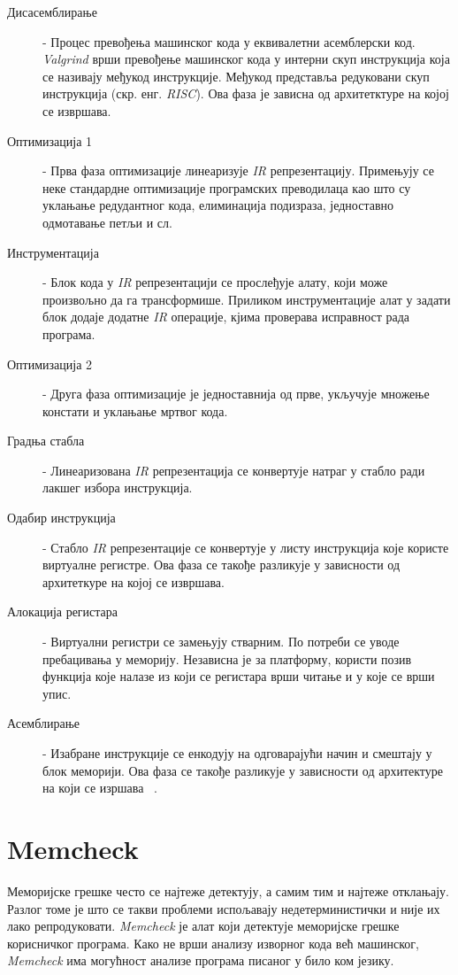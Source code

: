 \documentclass[12pt,oneside]{memoir}
\begin{document}
\begin{description}
	\item[Дисасемблирање] - Процес превођења машинског кода у еквивалетни асемблерски код. \textit{Valgrind} врши превођење машинског кода у интерни скуп инструкција која се називају међукод инструкције. Међукод представља редуковани скуп инструкција (скр. енг. \textit{RISC}). Ова фаза је зависна од архитетктуре на којој се извршава.
	\item[Оптимизација 1] - Прва фаза оптимизације линеаризује \textit{IR} репрезентацију. Примењују се неке стандардне оптимизације програмских преводилаца као што су уклањање редудантног кода, елиминација подизраза, једноставно одмотавање петљи и сл.
	\item[Инструментација] - Блок кода у \textit{IR} репрезентацији се прослеђује алату, који може произвољно да га трансформише. Приликом инструментације алат у задати блок додаје додатне \textit{IR} операције, кјима проверава исправност рада програма.
	\item[Оптимизација 2] - Друга фаза оптимизације је једноставнија од прве, укључује множење констати и уклањање мртвог кода.
	\item[Градња стабла] - Линеаризована \textit{IR} репрезентација се конвертује натраг у стабло ради лакшег избора инструкција.
	\item[Одабир инструкција] - Стабло \textit{IR} репрезентације се конвертује у листу инструкција које користе виртуалне регистре. Ова фаза се такође разликује у зависности од архитеткуре на којој се извршава.
	\item[Алокација регистара] - Виртуални регистри се замењују стварним. По потреби се уводе пребацивања у меморију. Независна је за платформу, користи позив функција које налазе из који се регистара врши читање и у које се врши упис.
	\item[Асемблирање] - Изабране инструкције се енкодују на одговарајући начин и смештају у блок меморији. Ова фаза се такође разликује у зависности  од архитектуре на који се изршава ~\cite{SeeMIPSRun}.
\end{description}

\section{Memcheck}
\label{section_memcheck}

\indent Меморијске грешке често се најтеже детектују, а самим тим и најтеже отклањају. Разлог томе је што се такви проблеми испољавају недетерминистички и није их лако репродуковати. \textit{Memcheck} је алат који детектује меморијске грешке корисничког програма. Како не врши анализу изворног кода већ машинског, \textit{Memcheck} има могућност анализе програма писаног у било ком језику.
\end{document}
